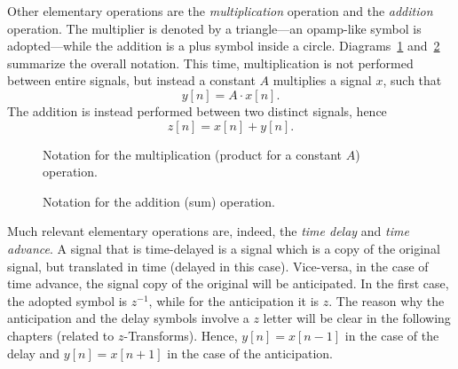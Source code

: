 \documentclass[\documentfontsize, twocolumn]{\classname}
\begin{document}
Other elementary operations are the \emph{multiplication} operation and the \emph{addition} operation. The multiplier is denoted by a triangle---an opamp-like symbol is adopted---while the addition is a plus symbol inside a circle. Diagrams~\ref{tikz:multiplication-operation} and~\ref{tikz:addition-operation} summarize the overall notation. This time, multiplication is not performed between entire signals, but instead a constant $A$ multiplies a signal $x$, such that $$y[n] = A \cdot x[n].$$ The addition is instead performed between two distinct signals, hence $$z[n] = x[n] + y[n].$$

\begin{figure}[ht]
\begin{center}
    \caption{Notation for the multiplication (product for a constant $A$) operation.}\label{tikz:multiplication-operation}
\end{center}
\end{figure}

\begin{figure}[ht]
\begin{center}
\caption{Notation for the addition (sum) operation.}\label{tikz:addition-operation}
\end{center}
\end{figure}

Much relevant elementary operations are, indeed, the \emph{time delay} and
\emph{time advance}. A signal that is time-delayed is a signal which is a copy
of the original signal, but translated in time (delayed in this case).
Vice-versa, in the case of time advance, the signal copy of the original will be
anticipated. In the first case, the adopted symbol is $z^{-1}$, while for the
anticipation it is $z$. The reason why the anticipation and the delay symbols involve a $z$ letter will be clear in the following chapters (related to $z$-Transforms). Hence, $y[n] = x[n - 1]$ in the case of the delay and $y[n] = x[n + 1]$ in the case of the anticipation.
\end{document}
